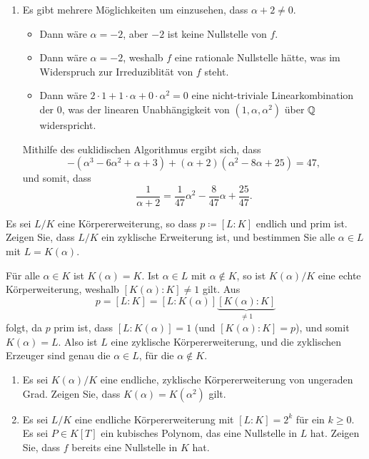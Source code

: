 \begin{solution}
\begin{enumerate}
    \item
      Es gibt mehrere Möglichkeiten um einzusehen, dass $\alpha + 2 \neq 0$.
      \begin{itemize}
        \item
          Dann wäre $\alpha = -2$, aber $-2$ ist keine Nullstelle von $f$.
        \item
          Dann wäre $\alpha = -2$, weshalb $f$ eine rationale Nullstelle hätte, was im Widerspruch zur Irreduziblität von $f$ steht.
        \item
          Dann wäre $2 \cdot 1 + 1 \cdot \alpha + 0 \cdot \alpha^2 = 0$ eine nicht-triviale Linearkombination der $0$, was der linearen Unabhängigkeit von $(1, \alpha, \alpha^2)$ über $\mathbb{Q}$ widerspricht.
      \end{itemize}
      Mithilfe des euklidischen Algorithmus ergibt sich, dass
      \[
        -(\alpha^3 - 6 \alpha^2 + \alpha + 3) + (\alpha + 2)(\alpha^2 - 8 \alpha + 25) = 47,
      \]
      und somit, dass
      \[
          \frac{1}{\alpha + 2}
        = \frac{1}{47} \alpha^2 - \frac{8}{47} \alpha + \frac{25}{47}.  
      \]
  \end{enumerate}
\end{solution}


\begin{question}[subtitle = Erweiterungen vom primer Ordnung]
  Es sei $L/K$ eine Körpererweiterung, so dass $p \coloneqq [L : K]$ endlich und prim ist.
  Zeigen Sie, dass $L/K$ ein zyklische Erweiterung ist, und bestimmen Sie alle $\alpha \in L$ mit $L = K(\alpha)$.
\end{question}


\begin{solution}
  Für alle $\alpha \in K$ ist $K(\alpha) = K$.
  Ist $\alpha \in L$ mit $\alpha \notin K$, so ist $K(\alpha)/K$ eine echte Körperweiterung, weshalb $[K(\alpha) : K] \neq 1$ gilt.
  Aus
  \[
      p
    = [L : K]
    = [L : K(\alpha)] \underbrace{[K(\alpha) : K]}_{\neq 1}
  \]
  folgt, da $p$ prim ist, dass $[L : K(\alpha)] = 1$ (und $[K(\alpha) : K] = p$), und somit $K(\alpha) = L$.
  Also ist $L$ eine zyklische Körpererweiterung, und die zyklischen Erzeuger sind genau die $\alpha \in L$, für die $\alpha \notin K$.
\end{solution}


\begin{question}[subtitle = Zum Grad]
  \begin{enumerate}
    \item
      Es sei $K(\alpha)/K$ eine endliche, zyklische Körpererweiterung von ungeraden Grad.
      Zeigen Sie, dass $K(\alpha) = K(\alpha^2)$ gilt.
    \item
      Es sei $L/K$ eine endliche Körpererweiterung mit $[L : K] = 2^k$ für ein $k \geq 0$.
      Es sei $P \in K[T]$ ein kubisches Polynom, das eine Nullstelle in $L$ hat.
      Zeigen Sie, dass $f$ bereits eine Nullstelle in $K$ hat.
  \end{enumerate}
\end{question}


